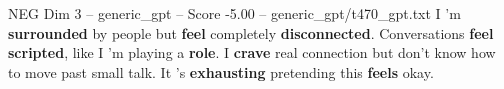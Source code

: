 \begin{textsample}{NEG Dim 3 – generic\_gpt – Score -5.00 – generic\_gpt/t470\_gpt.txt}  \label{ex:f3_neg_014}
I ’m \textbf{surrounded} by people but \textbf{feel} completely \textbf{disconnected}.
Conversations \textbf{feel} \textbf{scripted}, like I ’m playing a \textbf{role}.
I \textbf{crave} real connection but don't know how to move past small talk.
It ’s \textbf{exhausting} pretending this \textbf{feels} okay.

\end{textsample}

